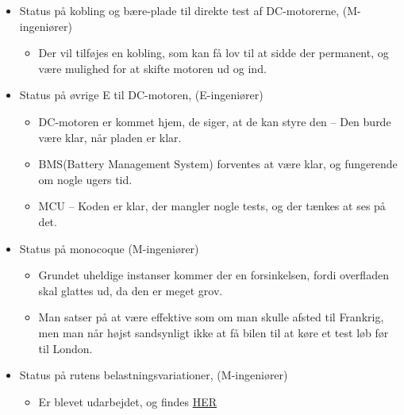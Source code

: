 \begin{enumerate}
			\begin{itemize}
				\item Status på kobling og bære-plade til direkte test af DC-motorerne, (M-ingeniører)
					\begin{itemize}
						\item Der vil tilføjes en kobling, som kan få lov til at sidde der permanent, og være mulighed for at skifte motoren ud og ind.
					\end{itemize}
			\end{itemize}
				
			\begin{itemize}
				\item Status på øvrige E til DC-motoren, (E-ingeniører)
					\begin{itemize}
						\item DC-motoren er kommet hjem, de siger, at de kan styre den – Den burde være klar, når pladen er klar.
						\item BMS(Battery Management System) forventes at være klar, og fungerende om nogle ugers tid.
						\item MCU – Koden er klar, der mangler nogle tests, og der tænkes at ses på det.
					\end{itemize}
			\end{itemize}
			
			\begin{itemize}
				\item Status på monocoque (M-ingeniører)
					\begin{itemize}
						\item Grundet uheldige instanser kommer der en forsinkelsen, fordi overfladen skal glattes ud, da den er meget grov.
						\item Man satser på at være effektive som om man skulle afsted til Frankrig, men man når højst sandsynligt ikke at få bilen til at køre et test løb før til London. 
					\end{itemize}
			\end{itemize}
	
			\begin{itemize}
				\item Status på rutens belastningsvariationer, (M-ingeniører)
					\begin{itemize}
						\item Er blevet udarbejdet, og findes
						\href{<https://www.dropbox.com/s/rn7g23q643xp2ua/Topographie\%20of\%20the\%20track\%20WITH\%20Force\%20Torque\%20and\%20Power.xlsx?dl=0>}{HER}
					\end{itemize}
			\end{itemize}
			

\end{enumerate}

